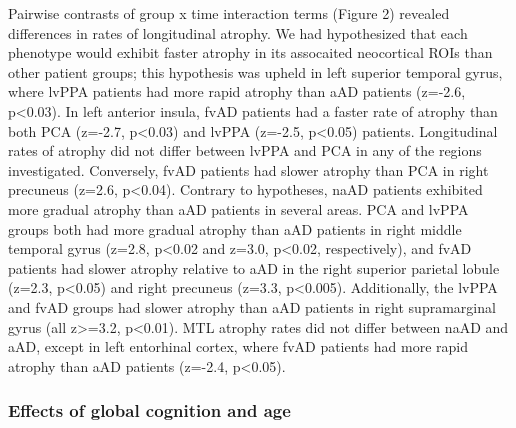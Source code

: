 \documentclass[]{article}
\begin{document}
Pairwise contrasts of group x time interaction terms (Figure 2) revealed
differences in rates of longitudinal atrophy. We had hypothesized that
each phenotype would exhibit faster atrophy in its assocaited
neocortical ROIs than other patient groups; this hypothesis was upheld
in left superior temporal gyrus, where lvPPA patients had more rapid
atrophy than aAD patients (z=-2.6, p\textless{}0.03). In left anterior
insula, fvAD patients had a faster rate of atrophy than both PCA
(z=-2.7, p\textless{}0.03) and lvPPA (z=-2.5, p\textless{}0.05)
patients. Longitudinal rates of atrophy did not differ between lvPPA and
PCA in any of the regions investigated. Conversely, fvAD patients had
slower atrophy than PCA in right precuneus (z=2.6, p\textless{}0.04).
Contrary to hypotheses, naAD patients exhibited more gradual atrophy
than aAD patients in several areas. PCA and lvPPA groups both had more
gradual atrophy than aAD patients in right middle temporal gyrus (z=2.8,
p\textless{}0.02 and z=3.0, p\textless{}0.02, respectively), and fvAD
patients had slower atrophy relative to aAD in the right superior
parietal lobule (z=2.3, p\textless{}0.05) and right precuneus (z=3.3,
p\textless{}0.005). Additionally, the lvPPA and fvAD groups had slower
atrophy than aAD patients in right supramarginal gyrus (all
z\textgreater{}=3.2, p\textless{}0.01). MTL atrophy rates did not differ
between naAD and aAD, except in left entorhinal cortex, where fvAD
patients had more rapid atrophy than aAD patients (z=-2.4,
p\textless{}0.05).

\subsubsection*{Effects of global cognition and
age}\label{effects-of-global-cognition-and-age}
\end{document}
